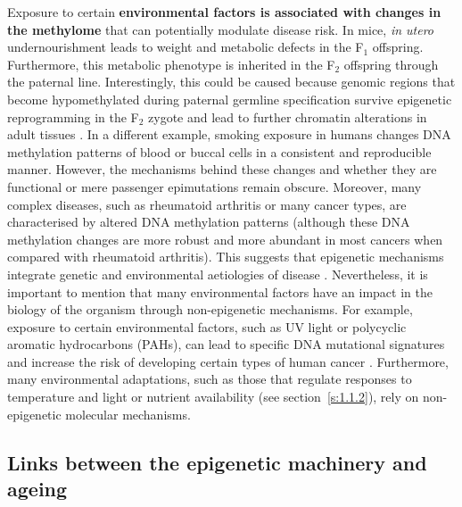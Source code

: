 \bigskip

Exposure to certain \textbf{environmental factors is associated with changes in the methylome} that can potentially modulate disease risk. In mice, \textit{in utero} undernourishment leads to weight and metabolic defects in the F$_1$ offspring. Furthermore, this metabolic phenotype is inherited in the F$_2$ offspring through the paternal line. Interestingly, this could be caused because genomic regions that become hypomethylated during paternal germline specification survive epigenetic reprogramming in the F$_2$ zygote and lead to further chromatin alterations in adult tissues \citep{Radford2014}. In a different example, smoking exposure in humans changes DNA methylation patterns of blood \citep{Roby2016} or buccal cells \citep{Teschendorff2015} in a consistent and reproducible manner. However, the mechanisms behind these changes and whether they are functional or mere passenger epimutations remain obscure. Moreover, many complex diseases, such as rheumatoid arthritis or many cancer types, are characterised by altered DNA methylation patterns (although these DNA methylation changes are more robust and more abundant in most cancers when compared with rheumatoid arthritis). This suggests that epigenetic mechanisms integrate genetic and environmental aetiologies of disease \citep{Liu2013,Widschwendter2018}. Nevertheless, it is important to mention that many environmental factors have an impact in the biology of the organism through non-epigenetic mechanisms. For example, exposure to certain environmental factors, such as UV light or polycyclic aromatic hydrocarbons (\acrshort{PAHs}), can lead to specific DNA mutational signatures and increase the risk of developing certain types of human cancer \citep{Kucab2019}. Furthermore, many environmental adaptations, such as those that regulate responses to temperature and light \citep{Narasimamurthy2017} or nutrient availability (see section~\ref{s:1.1.2}), rely on non-epigenetic molecular mechanisms. 

\smallskip

\subsection{Links between the epigenetic machinery and ageing} \label{s:1.2.3}

\smallskip

